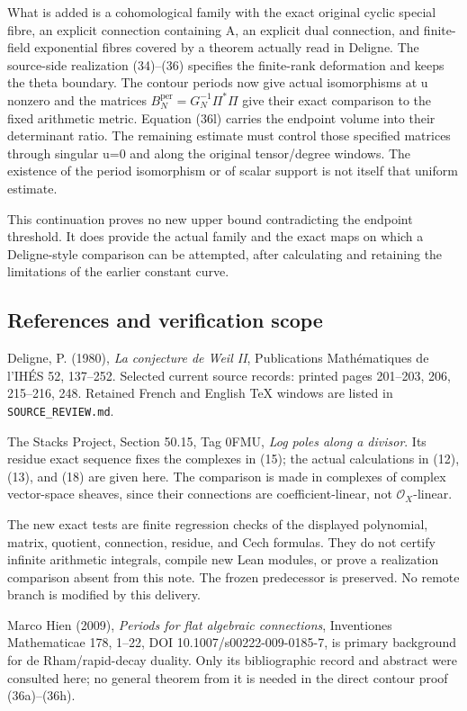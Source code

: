 \documentclass[
  11pt,
]{article}
\begin{document}
What is added is a cohomological family with the exact original cyclic
special fibre, an explicit connection containing A, an explicit dual
connection, and finite-field exponential fibres covered by a theorem
actually read in Deligne. The source-side realization (34)--(36)
specifies the finite-rank deformation and keeps the theta boundary. The
contour periods now give actual isomorphisms at u nonzero and the
matrices \(B_N^{\mathrm{per}}=G_N^{-1}\Pi^*\Pi\) give their exact
comparison to the fixed arithmetic metric. Equation (36l) carries the
endpoint volume into their determinant ratio. The remaining estimate
must control those specified matrices through singular u=0 and along the
original tensor/degree windows. The existence of the period isomorphism
or of scalar support is not itself that uniform estimate.

This continuation proves no new upper bound contradicting the endpoint
threshold. It does provide the actual family and the exact maps on which
a Deligne-style comparison can be attempted, after calculating and
retaining the limitations of the earlier constant curve.

\subsection{References and verification
scope}\label{references-and-verification-scope}

Deligne, P. (1980), \emph{La conjecture de Weil II}, Publications
Mathématiques de l'IHÉS 52, 137--252. Selected current source records:
printed pages 201--203, 206, 215--216, 248. Retained French and English
TeX windows are listed in \texttt{SOURCE\_REVIEW.md}.

The Stacks Project, Section 50.15, Tag 0FMU, \emph{Log poles along a
divisor}. Its residue exact sequence fixes the complexes in (15); the
actual calculations in (12), (13), and (18) are given here. The
comparison is made in complexes of complex vector-space sheaves, since
their connections are coefficient-linear, not \(\mathcal O_X\)-linear.

The new exact tests are finite regression checks of the displayed
polynomial, matrix, quotient, connection, residue, and Cech formulas.
They do not certify infinite arithmetic integrals, compile new Lean
modules, or prove a realization comparison absent from this note. The
frozen predecessor is preserved. No remote branch is modified by this
delivery.

Marco Hien (2009), \emph{Periods for flat algebraic connections},
Inventiones Mathematicae 178, 1--22, DOI 10.1007/s00222-009-0185-7, is
primary background for de Rham/rapid-decay duality. Only its
bibliographic record and abstract were consulted here; no general
theorem from it is needed in the direct contour proof (36a)--(36h).
\end{document}
